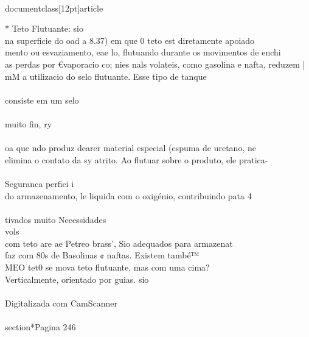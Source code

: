 \\documentclass[12pt]{article}
\begin{document}
* Teto Flutuante: sio\\
na superficie do oad a 8.37) em que 0 teto est diretamente apoiado\\
mento ou esvaziamento, eae lo, flutuando durante os movimentos de enchi\\
as perdas por €vaporacio co; nies nals volateis, como gasolina e nafta, reduzem |\\
mM a utilizacio do selo flutuante. Esse tipo de tanque\\
\\
consiste em um selo\\
\\
muito fin, ry\\
\\
oa que ndo produz dearer material especial (espuma de uretano, ne\\
elimina o contato da sy atrito. Ao flutuar sobre o produto, ele pratica-\\
\\
Seguranca perfici i\\
do armazenamento, le liquida com o oxigénio, contribuindo pata 4\\
\\
tivados muito Necessidades\\
vols\\
com teto are ae Petreo brass’, Sio adequados para armazenat\\
faz com 80s de Basolinas ¢ naftas. Existem també™\\
MEO tet0 se mova teto flutuante, mas com uma cima?\\
Verticalmente, orientado por guias. sio\\
\\
Digitalizada com CamScanner\\

\\section*{Pagina 246}
\end{document}
